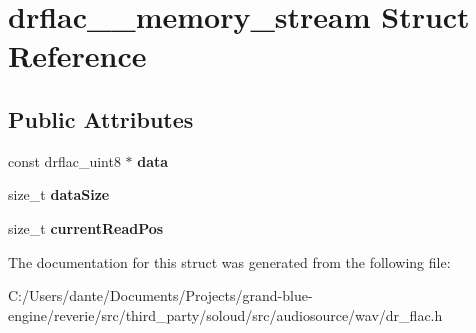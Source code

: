 \hypertarget{structdrflac____memory__stream}{}\section{drflac\+\_\+\+\_\+memory\+\_\+stream Struct Reference}
\label{structdrflac____memory__stream}
\subsection*{Public Attributes}
\begin{DoxyCompactItemize}
\item 
\mbox{\label{structdrflac____memory__stream_afa43ca3e8c704c01f4799a23901a7c0b}} 
const drflac\+\_\+uint8 $\ast$ {\bfseries data}
\item 
\mbox{\label{structdrflac____memory__stream_ae8c8f2854e22aed1fbaa9596171232ce}} 
size\+\_\+t {\bfseries data\+Size}
\item 
\mbox{\label{structdrflac____memory__stream_a7d9fbb8e7dc9c152825ded3efcc45dbe}} 
size\+\_\+t {\bfseries current\+Read\+Pos}
\end{DoxyCompactItemize}


The documentation for this struct was generated from the following file\+:\begin{DoxyCompactItemize}
\item 
C\+:/\+Users/dante/\+Documents/\+Projects/grand-\/blue-\/engine/reverie/src/third\+\_\+party/soloud/src/audiosource/wav/dr\+\_\+flac.\+h\end{DoxyCompactItemize}
